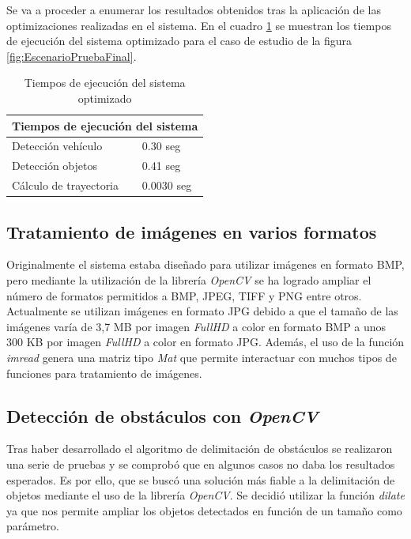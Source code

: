 Se va a proceder a enumerar los resultados obtenidos tras la aplicación de las optimizaciones realizadas en el sistema. En el cuadro \ref{tab:TiempoEjecucionSistemaOptimizado} se muestran los tiempos de ejecución del sistema optimizado para el caso de estudio de la figura \ref{fig:EscenarioPruebaFinal}.

\begin{table}[hbtp]
\centering
\begin{tabular}{|l|l|}
\hline
\multicolumn{2}{|c|}{\cellcolor[HTML]{9B9B9B}Tiempos de ejecución del sistema} \\ \hline
Detección vehículo                           & 0.30 seg                      \\ \hline
Detección objetos                            & 0.41 seg                      \\ \hline
Cálculo de trayectoria                       & 0.0030 seg                     \\ \hline
\end{tabular}
\caption {Tiempos de ejecución del sistema optimizado}
\label{tab:TiempoEjecucionSistemaOptimizado}
\end{table}
 

\subsection{Tratamiento de imágenes en varios formatos}

Originalmente el sistema estaba diseñado para utilizar imágenes en formato \ac{BMP}, pero mediante la utilización de la librería \emph{OpenCV} se ha logrado ampliar el número de formatos permitidos a \ac{BMP}, \ac{JPEG}, \ac{TIFF} y \ac{PNG} entre otros. Actualmente se utilizan imágenes en formato \ac{JPG} debido a que el tamaño de las imágenes varía de 3,7 \ac{MB} por imagen \emph{FullHD} a color en formato \ac{BMP} a unos 300 \acs{KB} por imagen \emph{FullHD} a color en formato \ac{JPG}. Además, el uso de la función \emph{imread} genera una matriz tipo \emph{Mat} que permite interactuar con muchos tipos de funciones para tratamiento de imágenes. 

\subsection{Detección de obstáculos con \emph{OpenCV}}

Tras haber desarrollado el algoritmo de delimitación de obstáculos se realizaron una serie de pruebas y se comprobó que en algunos casos no daba los resultados esperados. Es por ello, que se buscó una solución más fiable a la delimitación de objetos mediante el uso de la librería \emph{OpenCV}. Se decidió utilizar la función \emph{dilate} ya que nos permite ampliar los objetos detectados en función de un tamaño como parámetro.

